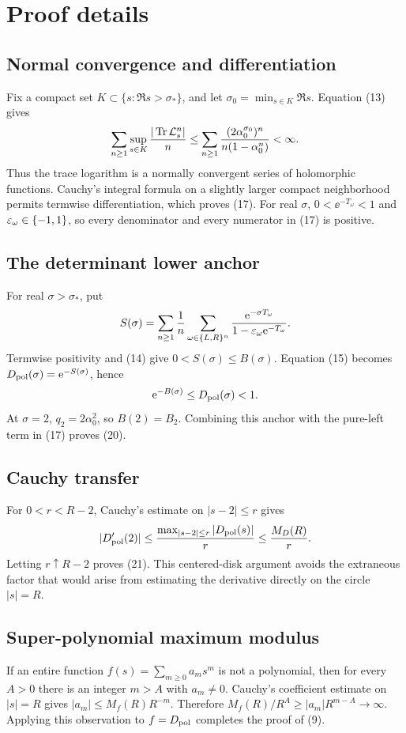 \section{Proof details}

\subsection{Normal convergence and differentiation}

Fix a compact set \(K\subset\{s:\Re s>\sigma_*\}\), and let
\(\sigma_0=\min_{s\in K}\Re s\).  Equation (13) gives
\[
 \sum_{n\ge1}\sup_{s\in K}
 \frac{|\operatorname{Tr}\mathcal L_s^n|}{n}
 \le
 \sum_{n\ge1}
 \frac{(2\alpha_0^{\sigma_0})^n}
 {n(1-\alpha_0^n)}<\infty.
\]
Thus the trace logarithm is a normally convergent series of holomorphic
functions.  Cauchy's integral formula on a slightly larger compact
neighborhood permits termwise differentiation, which proves (17).  For real
\(\sigma\), \(0<\ee^{-T_\omega}<1\) and
\(\varepsilon_\omega\in\{-1,1\}\), so every denominator and every numerator in
(17) is positive.

\subsection{The determinant lower anchor}

For real \(\sigma>\sigma_*\), put
\[
 S(\sigma)=\sum_{n\ge1}\frac1n
 \sum_{\omega\in\{L,R\}^n}
 \frac{\mathrm e^{-\sigma T_\omega}}
 {1-\varepsilon_\omega\mathrm e^{-T_\omega}}.
\]
Termwise positivity and (14) give
\(0<S(\sigma)\le B(\sigma)\).  Equation (15) becomes
\(D_{\mathrm{pol}}(\sigma)=\mathrm e^{-S(\sigma)}\), hence
\[
 \mathrm e^{-B(\sigma)}\le D_{\mathrm{pol}}(\sigma)<1.
\]
At \(\sigma=2\), \(q_2=2\alpha_0^2\), so \(B(2)=B_2\).  Combining this
anchor with the pure-left term in (17) proves (20).

\subsection{Cauchy transfer}

For \(0<r<R-2\), Cauchy's estimate on \(|s-2|\le r\) gives
\[
 |D_{\mathrm{pol}}'(2)|\le
 \frac{\max_{|s-2|\le r}|D_{\mathrm{pol}}(s)|}{r}
 \le\frac{M_D(R)}{r}.
\]
Letting \(r\uparrow R-2\) proves (21).  This centered-disk argument avoids
the extraneous factor that would arise from estimating the derivative
directly on the circle \(|s|=R\).

\subsection{Super-polynomial maximum modulus}

If an entire function \(f(s)=\sum_{m\ge0}a_ms^m\) is not a polynomial, then
for every \(A>0\) there is an integer \(m>A\) with \(a_m\ne0\).  Cauchy's
coefficient estimate on \(|s|=R\) gives
\(|a_m|\le M_f(R)R^{-m}\).  Therefore
\(M_f(R)/R^A\ge|a_m|R^{m-A}\to\infty\).  Applying this observation to
\(f=D_{\mathrm{pol}}\) completes the proof of (9).
